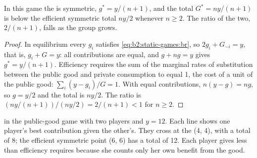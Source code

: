 \begin{proposition}[Underprovision]\label{prop:b2:static-games:underprovision}
In this game the  is symmetric, $g^* = y/(n + 1)$, and the total $G^* = ny/(n + 1)$ is below the
efficient symmetric total $ny/2$ whenever $n \ge 2$. The ratio of the two, $2/(n + 1)$, falls as the group grows.
\end{proposition}

\begin{proof}
In equilibrium every $g_i$ satisfies \eqref{eq:b2:static-games:br}, so $2g_i + G_{-i} = y$, that is, $g_i + G = y$:
all contributions are equal, and $g + ng = y$ gives $g^* = y/(n + 1)$. Efficiency requires the sum of the marginal
rates of substitution between the public good and private consumption to equal 1, the cost of a unit of the
public good: $\sum_i (y - g_i)/G = 1$. With equal contributions, $n(y - g) = ng$, so $g = y/2$ and the total is
$ny/2$. The ratio is $(ny/(n + 1))/(ny/2) = 2/(n + 1) < 1$ for $n \ge 2$.
\end{proof}

\begin{omfigure}

{\small {} in the public-good game with two players and $y = 12$. Each line shows one player's best
contribution given the other's. They cross at the  (4, 4), with a total of 8; the efficient
symmetric point (6, 6) has a total of 12. Each player gives less than efficiency requires because she counts
only her own benefit from the good.}
\end{omfigure}

